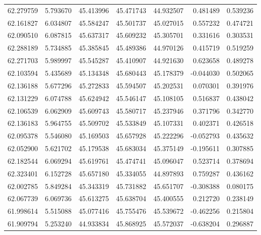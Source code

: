 \begin{tabular}{rrrrrrr}
 62.279759 &   5.793670 &         45.413996 &         45.471743 &         44.932507 &  0.481489 &  0.539236 \\
 62.161827 &   6.034807 &         45.584247 &         45.501737 &         45.027015 &  0.557232 &  0.474721 \\
 62.090510 &   6.087815 &         45.637317 &         45.609232 &         45.305701 &  0.331616 &  0.303531 \\
 62.288189 &   5.734885 &         45.385845 &         45.489386 &         44.970126 &  0.415719 &  0.519259 \\
 62.271703 &   5.989997 &         45.545287 &         45.410907 &         44.921630 &  0.623658 &  0.489278 \\
 62.103594 &   5.435689 &         45.134348 &         45.680443 &         45.178379 & -0.044030 &  0.502065 \\
 62.136188 &   5.677296 &         45.272833 &         45.594507 &         45.202531 &  0.070301 &  0.391976 \\
 62.131229 &   6.074788 &         45.624942 &         45.546147 &         45.108105 &  0.516837 &  0.438042 \\
 62.106539 &   6.062909 &         45.609743 &         45.580717 &         45.237946 &  0.371796 &  0.342770 \\
 62.136183 &   5.964755 &         45.509702 &         45.533849 &         45.107331 &  0.402371 &  0.426518 \\
 62.095378 &   5.546080 &         45.169503 &         45.657928 &         45.222296 & -0.052793 &  0.435632 \\
 62.052900 &   5.621702 &         45.179538 &         45.683034 &         45.375149 & -0.195611 &  0.307885 \\
 62.182544 &   6.069294 &         45.619761 &         45.474741 &         45.096047 &  0.523714 &  0.378694 \\
 62.323401 &   6.152728 &         45.657180 &         45.334055 &         44.897893 &  0.759287 &  0.436162 \\
 62.002785 &   5.849284 &         45.343319 &         45.731882 &         45.651707 & -0.308388 &  0.080175 \\
 62.067739 &   6.069736 &         45.613275 &         45.638704 &         45.400555 &  0.212720 &  0.238149 \\
 61.998614 &   5.515088 &         45.077416 &         45.755476 &         45.539672 & -0.462256 &  0.215804 \\
 61.909794 &   5.253240 &         44.933834 &         45.868925 &         45.572037 & -0.638204 &  0.296887 \\

\end{tabular}
